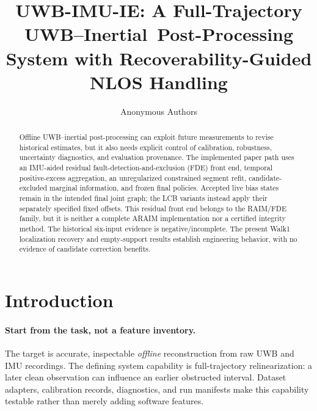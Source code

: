 \documentclass[conference]{IEEEtran}%
\title{UWB-IMU-IE: A Full-Trajectory UWB--Inertial\
Post-Processing System with Recoverability-Guided NLOS Handling}
\author{Anonymous Authors}
\begin{document}
\maketitle

\noindent{}

\begin{abstract}
Offline UWB--inertial post-processing can exploit future measurements to revise historical estimates, but it also needs explicit control of calibration, robustness, uncertainty diagnostics, and evaluation provenance. The implemented paper path uses an IMU-aided residual fault-detection-and-exclusion (FDE) front end, temporal positive-excess aggregation, an unregularized constrained segment refit, candidate-excluded marginal information, and frozen final policies. Accepted live bias states remain in the intended final joint graph; the LCB variants instead apply their separately specified fixed offsets. This residual front end belongs to the RAIM/FDE family, but it is neither a complete ARAIM implementation nor a certified integrity method. The historical six-input evidence is negative/incomplete. The present Walk1 localization recovery and empty-support results establish engineering behavior, with no evidence of candidate correction benefits.
\end{abstract}

\section{Introduction}
\label{sec:intro}
\paragraph{Start from the task, not a feature inventory.}
The target is accurate, inspectable \emph{offline} reconstruction from raw UWB and IMU recordings. The defining system capability is full-trajectory relinearization: a later clean observation can influence an earlier obstructed interval. Dataset adapters, calibration records, diagnostics, and run manifests make this capability testable rather than merely adding software features.
\end{document}
